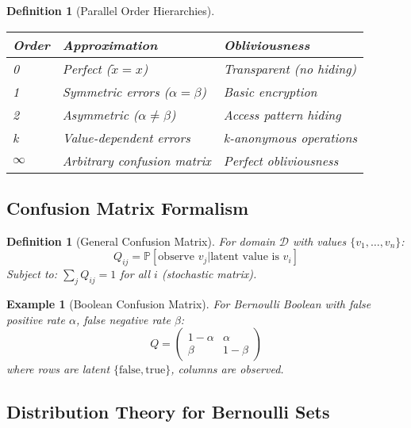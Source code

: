 \documentclass[11pt,final]{article}
\newcommand{\latent}[1]{#1}
\newcommand{\observed}[1]{\tilde{#1}}
\newtheorem{definition}[theorem]{Definition}
\newtheorem{example}[theorem]{Example}
\begin{document}
\begin{definition}[Parallel Order Hierarchies]
\begin{center}
\begin{tabular}{lll}
\toprule
\textbf{Order} & \textbf{Approximation} & \textbf{Obliviousness} \\
\midrule
0 & Perfect ($\observed{x} = \latent{x}$) & Transparent (no hiding) \\
1 & Symmetric errors ($\alpha = \beta$) & Basic encryption \\
2 & Asymmetric ($\alpha \neq \beta$) & Access pattern hiding \\
k & Value-dependent errors & k-anonymous operations \\
$\infty$ & Arbitrary confusion matrix & Perfect obliviousness \\
\bottomrule
\end{tabular}
\end{center}
\end{definition}

\subsection{Confusion Matrix Formalism}

\begin{definition}[General Confusion Matrix]
For domain $\mathcal{D}$ with values $\{v_1, \ldots, v_n\}$:
\begin{equation}
Q_{ij} = \mathbb{P}[\text{observe } v_j | \text{latent value is } v_i]
\end{equation}
Subject to: $\sum_j Q_{ij} = 1$ for all $i$ (stochastic matrix).
\end{definition}

\begin{example}[Boolean Confusion Matrix]
For Bernoulli Boolean with false positive rate $\alpha$, false negative rate $\beta$:
\begin{equation}
Q = \begin{pmatrix}
1-\alpha & \alpha \\
\beta & 1-\beta
\end{pmatrix}
\end{equation}
where rows are latent $\{\text{false}, \text{true}\}$, columns are observed.
\end{example}

\subsection{Distribution Theory for Bernoulli Sets}
\end{document}
